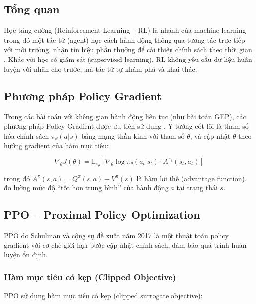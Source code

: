 \subsection{Tổng quan}

Học tăng cường (Reinforcement Learning -- RL) là nhánh của machine learning trong đó một tác tử (agent) học cách hành động thông qua tương tác trực tiếp với môi trường, nhận tín hiệu phần thưởng để cải thiện chính sách theo thời gian \cite{sutton2018rl}. Khác với học có giám sát (supervised learning), RL không yêu cầu dữ liệu huấn luyện với nhãn cho trước, mà tác tử tự khám phá và khai thác.

\subsection{Phương pháp Policy Gradient}

Trong các bài toán với không gian hành động liên tục (như bài toán GEP), các phương pháp Policy Gradient được ưu tiên sử dụng \cite{schulman2015trpo}. Ý tưởng cốt lõi là tham số hóa chính sách $\pi_\theta(a|s)$ bằng mạng thần kinh với tham số $\theta$, và cập nhật $\theta$ theo hướng gradient của hàm mục tiêu:

\begin{equation}
    \nabla_\theta J(\theta) = \mathbb{E}_{\pi_\theta}\left[\nabla_\theta \log \pi_\theta(a_t | s_t) \cdot A^{\pi_\theta}(s_t, a_t)\right]
    \label{eq:policy_gradient}
\end{equation}

\noindent trong đó $A^{\pi}(s, a) = Q^{\pi}(s, a) - V^{\pi}(s)$ là hàm lợi thế (advantage function), đo lường mức độ ``tốt hơn trung bình'' của hành động $a$ tại trạng thái $s$.

\subsection{PPO -- Proximal Policy Optimization}

PPO do Schulman và cộng sự đề xuất năm 2017 \cite{schulman2017ppo} là một thuật toán policy gradient với cơ chế giới hạn bước cập nhật chính sách, đảm bảo quá trình huấn luyện ổn định.

\subsubsection{Hàm mục tiêu có kẹp (Clipped Objective)}

PPO sử dụng hàm mục tiêu có kẹp (clipped surrogate objective):

